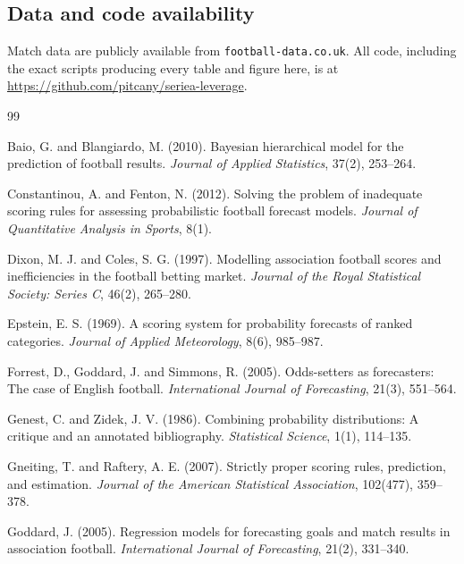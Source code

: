 \documentclass[11pt]{article}
\begin{document}
\subsection*{Data and code availability}

Match data are publicly available from \texttt{football-data.co.uk}. All code,
including the exact scripts producing every table and figure here, is at
\url{https://github.com/pitcany/seriea-leverage}.

\begin{thebibliography}{99}

Baio, G. and Blangiardo, M. (2010).
Bayesian hierarchical model for the prediction of football results.
\emph{Journal of Applied Statistics}, 37(2), 253--264.

Constantinou, A. and Fenton, N. (2012).
Solving the problem of inadequate scoring rules for assessing probabilistic
football forecast models.
\emph{Journal of Quantitative Analysis in Sports}, 8(1).

Dixon, M. J. and Coles, S. G. (1997).
Modelling association football scores and inefficiencies in the football
betting market.
\emph{Journal of the Royal Statistical Society: Series C}, 46(2), 265--280.

Epstein, E. S. (1969).
A scoring system for probability forecasts of ranked categories.
\emph{Journal of Applied Meteorology}, 8(6), 985--987.

Forrest, D., Goddard, J. and Simmons, R. (2005).
Odds-setters as forecasters: The case of English football.
\emph{International Journal of Forecasting}, 21(3), 551--564.

Genest, C. and Zidek, J. V. (1986).
Combining probability distributions: A critique and an annotated bibliography.
\emph{Statistical Science}, 1(1), 114--135.

Gneiting, T. and Raftery, A. E. (2007).
Strictly proper scoring rules, prediction, and estimation.
\emph{Journal of the American Statistical Association}, 102(477), 359--378.

Goddard, J. (2005).
Regression models for forecasting goals and match results in association
football.
\emph{International Journal of Forecasting}, 21(2), 331--340.


\end{thebibliography}
\end{document}
